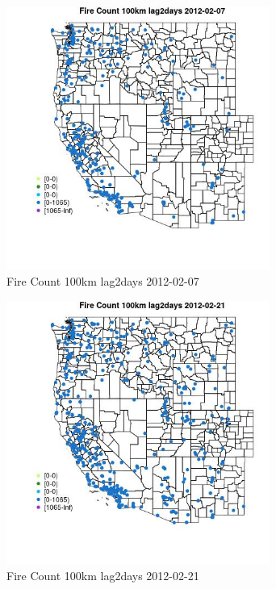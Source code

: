 \begin{figure} 
\centering  
\includegraphics[width=0.77\textwidth]{Code_Outputs/Report_ML_input_PM25_Step4_part_f_de_duplicated_aveswNAs_MapObsFire_Count_100km_lag2days2012-02-07.jpg} 
\caption{\label{fig:Report_ML_input_PM25_Step4_part_f_de_duplicated_aveswNAsMapObsFire_Count_100km_lag2days2012-02-07}Fire Count 100km lag2days 2012-02-07} 
\end{figure} 
 

\begin{figure} 
\centering  
\includegraphics[width=0.77\textwidth]{Code_Outputs/Report_ML_input_PM25_Step4_part_f_de_duplicated_aveswNAs_MapObsFire_Count_100km_lag2days2012-02-21.jpg} 
\caption{\label{fig:Report_ML_input_PM25_Step4_part_f_de_duplicated_aveswNAsMapObsFire_Count_100km_lag2days2012-02-21}Fire Count 100km lag2days 2012-02-21} 
\end{figure} 
 

